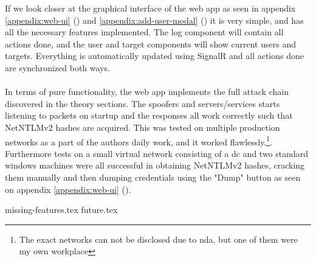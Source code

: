 \documentclass{article}
\begin{document}
If we look closer at the graphical interface of the web app as seen in appendix \ref{appendix:web-ui} () and \ref{appendix:add-user-modal} () it is very simple, and has all the necessary features implemented. The log component will contain all actions done, and the user and target components will show current users and targets. Everything is automatically updated using SignalR and all actions done are synchronized both ways.
\\\\
In terms of pure functionality, the web app implements the full attack chain discovered in the theory sections. The spoofers and servers/services starts listening to packets on startup and the responses all work correctly such that NetNTLMv2 hashes are acquired. This was tested on multiple production networks as a part of the authors daily work, and it worked flawlessly.\footnote{The exact networks can not be disclosed due to \gls{nda}, but one of them were my own workplace}. Furthermore tests on a small virtual network consisting of a \gls{dc} and two standard windows machines were all successful in obtaining NetNTLMv2 hashes, cracking them manually and then dumping credentials using the "Dump" button as seen on appendix \ref{appendix:web-ui} ().

{missing-features.tex}
{future.tex}
\end{document}
